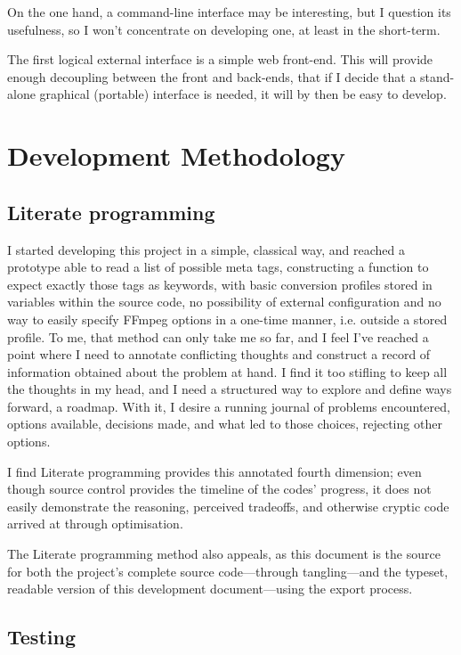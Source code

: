 \documentclass{article}
\begin{document}
On the one hand, a command-line interface may be interesting, but I question
its usefulness, so I won't concentrate on developing one, at least in the
short-term.

The first logical external interface is a simple web front-end. This will
provide enough decoupling between the front and back-ends, that if I decide
that a stand-alone graphical (portable) interface is needed, it will by then be
easy to develop.

\section{Development Methodology}
\label{sec:orgadc7537}

\subsection{Literate programming}
\label{sec:org4c6a5c1}

I started developing this project in a simple, classical way, and reached a
prototype able to read a list of possible meta tags, constructing a function to
expect exactly those tags as keywords, with basic conversion profiles stored in
variables within the source code, no possibility of external configuration and
no way to easily specify FFmpeg options in a one-time manner, i.e. outside a
stored profile. To me, that method can only take me so far, and I feel I've
reached a point where I need to annotate conflicting thoughts and construct a
record of information obtained about the problem at hand. I find it too stifling
to keep all the thoughts in my head, and I need a structured way to explore and
define ways forward, a roadmap. With it, I desire a running journal of problems
encountered, options available, decisions made, and what led to those choices,
rejecting other options.

I find Literate programming provides this annotated fourth dimension; even
though source control provides the timeline of the codes' progress, it does not
easily demonstrate the reasoning, perceived tradeoffs, and otherwise cryptic
code arrived at through optimisation.

The Literate programming method also appeals, as this document is the source for
both the project's complete source code---through tangling---and the typeset,
readable version of this development document---using the export process.

\subsection{Testing}
\label{sec:org97528dd}
\end{document}
